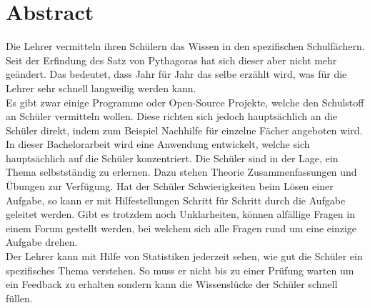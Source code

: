 \section*{Abstract}
Die Lehrer vermitteln ihren Schülern das Wissen in den spezifischen Schulfächern. Seit der Erfindung des Satz von Pythagoras hat sich dieser aber nicht mehr geändert. Das bedeutet, dass Jahr für Jahr das selbe erzählt wird, was für die Lehrer sehr schnell langweilig werden kann. \\

Es gibt zwar einige Programme oder Open-Source Projekte, welche den Schulstoff an Schüler vermitteln wollen. Diese richten sich jedoch hauptsächlich an die Schüler direkt, indem zum Beispiel Nachhilfe für einzelne Fächer angeboten wird.  \\

In dieser Bachelorarbeit wird eine Anwendung entwickelt, welche sich hauptsächlich auf die Schüler konzentriert. Die Schüler sind in der Lage, ein Thema selbstständig zu erlernen. Dazu stehen Theorie Zusammenfassungen und Übungen zur Verfügung. Hat der Schüler Schwierigkeiten beim Lösen einer Aufgabe, so kann er mit Hilfestellungen Schritt für Schritt durch die Aufgabe geleitet werden. Gibt es trotzdem noch Unklarheiten, können alfällige Fragen in einem Forum gestellt werden, bei welchem sich alle Fragen rund um eine einzige Aufgabe drehen. \\

Der Lehrer kann mit Hilfe von Statistiken jederzeit sehen, wie gut die Schüler ein spezifisches Thema verstehen. So muss er nicht bis zu einer Prüfung warten um ein Feedback zu erhalten sondern kann die Wissenslücke der Schüler schnell füllen.

\newpage